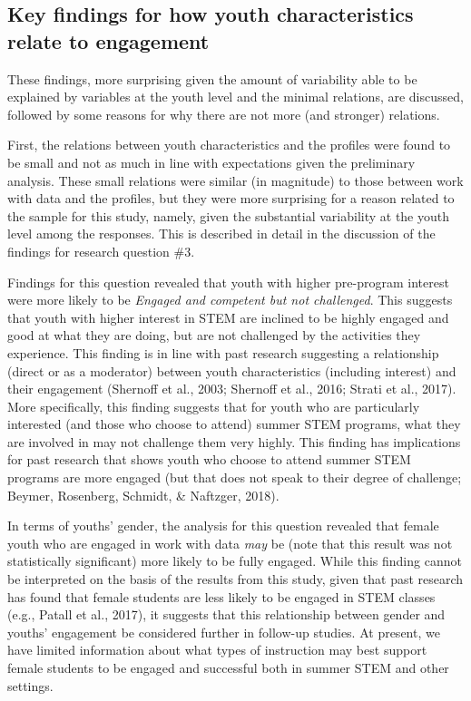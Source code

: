 \documentclass[]{msu-thesis}
\theoremstyle{definition}
\theoremstyle{definition}
\theoremstyle{definition}
\theoremstyle{remark}
\begin{document}
\subsection{Key findings for how youth characteristics relate to
engagement}\label{key-findings-for-how-youth-characteristics-relate-to-engagement}

These findings, more surprising given the amount of variability able to
be explained by variables at the youth level and the minimal relations,
are discussed, followed by some reasons for why there are not more (and
stronger) relations.

First, the relations between youth characteristics and the profiles were
found to be small and not as much in line with expectations given the
preliminary analysis. These small relations were similar (in magnitude)
to those between work with data and the profiles, but they were more
surprising for a reason related to the sample for this study, namely,
given the substantial variability at the youth level among the
responses. This is described in detail in the discussion of the findings
for research question \#3.

Findings for this question revealed that youth with higher pre-program
interest were more likely to be \emph{Engaged and competent but not
challenged}. This suggests that youth with higher interest in STEM are
inclined to be highly engaged and good at what they are doing, but are
not challenged by the activities they experience. This finding is in
line with past research suggesting a relationship (direct or as a
moderator) between youth characteristics (including interest) and their
engagement (Shernoff et al., 2003; Shernoff et al., 2016; Strati et al.,
2017). More specifically, this finding suggests that for youth who are
particularly interested (and those who choose to attend) summer STEM
programs, what they are involved in may not challenge them very highly.
This finding has implications for past research that shows youth who
choose to attend summer STEM programs are more engaged (but that does
not speak to their degree of challenge; Beymer, Rosenberg, Schmidt, \&
Naftzger, 2018).

In terms of youths' gender, the analysis for this question revealed that
female youth who are engaged in work with data \emph{may} be (note that
this result was not statistically significant) more likely to be fully
engaged. While this finding cannot be interpreted on the basis of the
results from this study, given that past research has found that female
students are less likely to be engaged in STEM classes (e.g., Patall et
al., 2017), it suggests that this relationship between gender and
youths' engagement be considered further in follow-up studies. At
present, we have limited information about what types of instruction may
best support female students to be engaged and successful both in summer
STEM and other settings.
\end{document}
